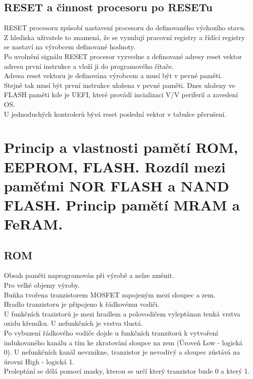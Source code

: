 \subsection{RESET a činnost procesoru po RESETu}
RESET procesoru způsobí nastavení procesoru do definovaného výchozího stavu.\\
Z hlediska uživatele to znamená, že se vynulují pracovní registry a řídící registry se nastaví na výrobcem definované hodnoty.\\
Po uvolnění signálu RESET procesor vyzvedne z definované adresy reset vektor adresu první instrukce a vloží ji do programového čítače.\\
Adresa reset vektoru je definována výrobcem a musí být v pevné paměti.\\
Stejně tak musí být první instrukce uložena v pevné paměti. Dnes uloženy ve FLASH paměti kde je UEFI, které provádí incializaci V/V periferií a zavedení OS.\\
U jednoduchých kontrolerů bývá reset poslední vektor v tabulce přerušení.\\

\section{Princip a vlastnosti pamětí ROM, EEPROM, FLASH. Rozdíl mezi paměťmi NOR FLASH a NAND FLASH. Princip pamětí MRAM a FeRAM.}
\subsection{ROM}
Obsah paměti naprogramován při výrobě a nelze změnit. \\
Pro velké objemy výroby. \\
Buňka tvořena tranzistorem MOSFET zapojeným mezi sloupec a zem. \\
Hradlo tranzistoru je připojeno k řádkovému vodiči. \\
U funkčních trazistorů je mezi hradlem a polovodičem vyleptánan tenká vrstva oxidu křemíku. U nefunkčních je vrstva tlustá. \\
Po vybuzení řádkového vodiče dojde u funkčních tranzitorů k vytvoření indukovaného kanálu a tím ke zkratování sloupce na zem (Úroveň Low - logická 0). U nefunkčních kanál nevznikne, tranzistor je nevodivý a sloupec zůstává na úrovni High - logická 1. \\
Proleptání se dělá pomocí masky, kterou se určí který tranzistor bude 0 a který 1. \\

